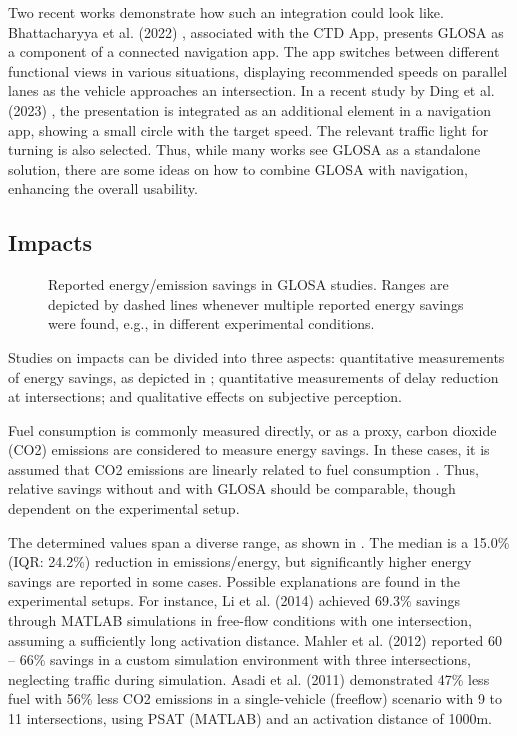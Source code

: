Two recent works demonstrate how such an integration could look like. Bhattacharyya et al. (2022) \cite{bhattacharyya_assessing_2022}, associated with the CTD App, presents GLOSA as a component of a connected navigation app. The app switches between different functional views in various situations, displaying recommended speeds on parallel lanes as the vehicle approaches an intersection. In a recent study by Ding et al. (2023) \cite{ding_speedadv_2023}, the presentation is integrated as an additional element in a navigation app, showing a small circle with the target speed. The relevant traffic light for turning is also selected. Thus, while many works see GLOSA as a standalone solution, there are some ideas on how to combine GLOSA with navigation, enhancing the overall usability.

\subsection{Impacts}

\begin{figure}
\centering
\resizebox{\linewidth}{!}{%

}
\caption{Reported energy/emission savings in GLOSA studies. Ranges are depicted by dashed lines whenever multiple reported energy savings were found, e.g., in different experimental conditions.}
\label{fig:related-work-energy-savings}
\end{figure}

Studies on impacts can be divided into three aspects: quantitative measurements of energy savings, as depicted in ; quantitative measurements of delay reduction at intersections; and qualitative effects on subjective perception.

Fuel consumption is commonly measured directly, or as a proxy, carbon dioxide (CO2) emissions are considered to measure energy savings. In these cases, it is assumed that CO2 emissions are linearly related to fuel consumption \cite{seredynski_comparison_2013, seredynski_multi-segment_2013}. Thus, relative savings without and with GLOSA should be comparable, though dependent on the experimental setup.

The determined values span a diverse range, as shown in . The median is a 15.0\% (IQR: 24.2\%) reduction in emissions/energy, but significantly higher energy savings are reported in some cases. Possible explanations are found in the experimental setups. For instance, Li et al. (2014) \cite{li_multi-vehicles_2014} achieved 69.3\% savings through MATLAB simulations in free-flow conditions with one intersection, assuming a sufficiently long activation distance. Mahler et al. (2012) \cite{mahler_reducing_2012} reported 60 -- 66\% savings in a custom simulation environment with three intersections, neglecting traffic during simulation. Asadi et al. (2011) \cite{asadi_predictive_2011} demonstrated 47\% less fuel with 56\% less CO2 emissions in a single-vehicle (freeflow) scenario with 9 to 11 intersections, using PSAT (MATLAB) and an activation distance of 1000m.

